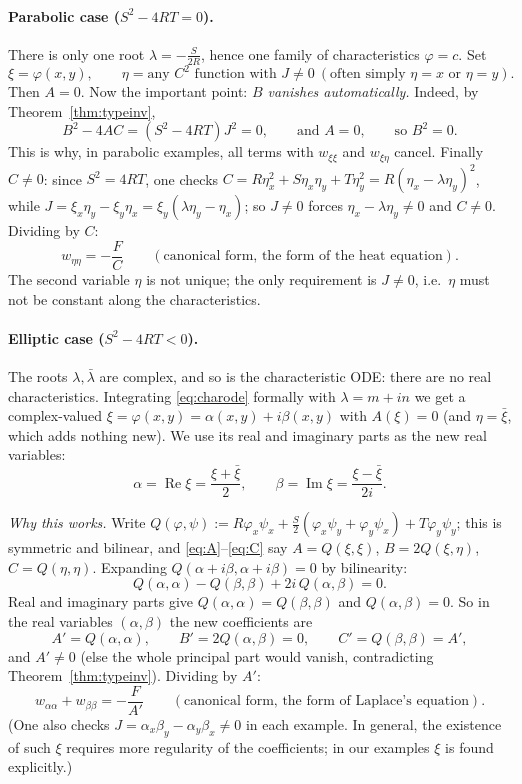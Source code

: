 \documentclass[11pt]{article}
\theoremstyle{plain}
\theoremstyle{definition}
\theoremstyle{remark}
\begin{document}
\paragraph{Parabolic case ($S^2 - 4RT = 0$).} There is only one root $\lambda = -\frac{S}{2R}$, hence one family of characteristics $\varphi = c$. Set
$$ \xi = \varphi(x,y), \qquad \eta = \text{any } C^2 \text{ function with } J \neq 0 \ (\text{often simply } \eta = x \text{ or } \eta = y). $$
Then $A = 0$. Now the important point: \emph{$B$ vanishes automatically.} Indeed, by Theorem~\ref{thm:typeinv},
$$ B^2 - 4AC = (S^2 - 4RT)J^2 = 0, \qquad \text{and } A = 0, \qquad \text{so } B^2 = 0. $$
This is why, in parabolic examples, all terms with $w_{\xi\xi}$ and $w_{\xi\eta}$ cancel. Finally $C \neq 0$: since $S^2 = 4RT$, one checks $C = R\eta_x^2 + S\eta_x\eta_y + T\eta_y^2 = R(\eta_x - \lambda\eta_y)^2$, while $J = \xi_x\eta_y - \xi_y\eta_x = \xi_y(\lambda\eta_y - \eta_x)$; so $J \neq 0$ forces $\eta_x - \lambda\eta_y \neq 0$ and $C \ne 0$. Dividing by $C$:
$$ w_{\eta\eta} = -\frac{F}{C} \qquad (\text{canonical form, the form of the heat equation}). $$
The second variable $\eta$ is not unique; the only requirement is $J \ne 0$, i.e.\ $\eta$ must not be constant along the characteristics.

\paragraph{Elliptic case ($S^2 - 4RT < 0$).} The roots $\lambda, \bar\lambda$ are complex, and so is the characteristic ODE: there are no real characteristics. Integrating \eqref{eq:charode} formally with $\lambda = m + in$ we get a complex-valued $\xi = \varphi(x,y) = \alpha(x,y) + i\beta(x,y)$ with $A(\xi) = 0$ (and $\eta = \bar\xi$, which adds nothing new). We use its real and imaginary parts as the new real variables:
$$ \alpha = \operatorname{Re}\xi = \frac{\xi + \bar\xi}{2}, \qquad \beta = \operatorname{Im}\xi = \frac{\xi - \bar\xi}{2i}. $$

\emph{Why this works.} Write $Q(\varphi,\psi) := R\varphi_x\psi_x + \frac S2(\varphi_x\psi_y + \varphi_y\psi_x) + T\varphi_y\psi_y$; this is symmetric and bilinear, and \eqref{eq:A}--\eqref{eq:C} say $A = Q(\xi,\xi)$, $B = 2Q(\xi,\eta)$, $C = Q(\eta,\eta)$. Expanding $Q(\alpha + i\beta, \alpha + i\beta) = 0$ by bilinearity:
$$ Q(\alpha,\alpha) - Q(\beta,\beta) + 2i\,Q(\alpha,\beta) = 0. $$
Real and imaginary parts give $Q(\alpha,\alpha) = Q(\beta,\beta)$ and $Q(\alpha,\beta) = 0$. So in the real variables $(\alpha,\beta)$ the new coefficients are
$$ A' = Q(\alpha,\alpha), \qquad B' = 2Q(\alpha,\beta) = 0, \qquad C' = Q(\beta,\beta) = A', $$
and $A' \ne 0$ (else the whole principal part would vanish, contradicting Theorem~\ref{thm:typeinv}). Dividing by $A'$:
$$ w_{\alpha\alpha} + w_{\beta\beta} = -\frac{F}{A'} \qquad (\text{canonical form, the form of Laplace's equation}). $$
(One also checks $J = \alpha_x\beta_y - \alpha_y\beta_x \neq 0$ in each example. In general, the existence of such $\xi$ requires more regularity of the coefficients; in our examples $\xi$ is found explicitly.)
\end{document}
